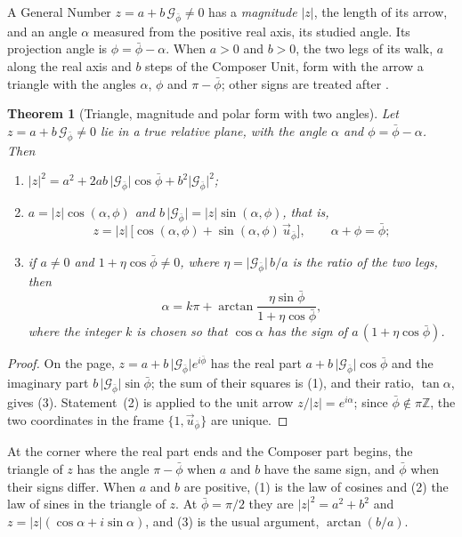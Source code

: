 \documentclass[11pt,a4paper]{amsart}
\theoremstyle{plain}
\newtheorem{theorem}{Theorem}[section]
\theoremstyle{definition}
\theoremstyle{remark}
\newcommand{\pb}{\bar{\phi}}                     %
\newcommand{\Gp}{\mathcal{G}_{\bar{\phi}}}       %
\newcommand{\up}{\vec{u}_{\bar{\phi}}}           %
\begin{document}
A General Number $z = a + b\,\Gp \neq 0$ has a \emph{magnitude} $\lvert z\rvert$, the length of its arrow, and an angle $\alpha$ measured from the positive real axis, its studied angle. Its projection angle is $\phi = \pb - \alpha$. When $a > 0$ and $b > 0$, the two legs of its walk, $a$ along the real axis and $b$ steps of the Composer Unit, form with the arrow a triangle with the angles $\alpha$, $\phi$ and $\pi - \pb$; other signs are treated after .

\begin{theorem}[Triangle, magnitude and polar form with two angles]\label{thm:triangle}
Let $z = a + b\,\Gp \neq 0$ lie in a true relative plane, with the angle $\alpha$ and $\phi = \pb - \alpha$. Then
\begin{enumerate}
  \item $\lvert z\rvert^2 = a^2 + 2ab\,\lvert\Gp\rvert\cos\pb + b^2\lvert\Gp\rvert^2$;
  \item $a = \lvert z\rvert\cos(\alpha, \phi)$ and $b\,\lvert\Gp\rvert = \lvert z\rvert\sin(\alpha, \phi)$, that is,
  \[
  z = \lvert z\rvert\,\bigl[\cos(\alpha, \phi) + \sin(\alpha, \phi)\,\up\bigr] , \qquad \alpha + \phi = \pb ;
  \]
  \item if $a \neq 0$ and $1 + \eta\cos\pb \neq 0$, where $\eta = \lvert\Gp\rvert\,b/a$ is the ratio of the two legs, then
  \[
  \alpha = k\pi + \arctan\frac{\eta\sin\pb}{1 + \eta\cos\pb} ,
  \]
  where the integer $k$ is chosen so that $\cos\alpha$ has the sign of $a\,(1 + \eta\cos\pb)$.
\end{enumerate}
\end{theorem}

\begin{proof}
On the page, $z = a + b\,\lvert\Gp\rvert e^{i\pb}$ has the real part $a + b\,\lvert\Gp\rvert\cos\pb$ and the imaginary part $b\,\lvert\Gp\rvert\sin\pb$; the sum of their squares is (1), and their ratio, $\tan\alpha$, gives (3). Statement~(2) is  applied to the unit arrow $z/\lvert z\rvert = e^{i\alpha}$; since $\pb \notin \pi\mathbb{Z}$, the two coordinates in the frame $\{1, \up\}$ are unique.
\end{proof}

At the corner where the real part ends and the Composer part begins, the triangle of $z$ has the angle $\pi - \pb$ when $a$ and $b$ have the same sign, and $\pb$ when their signs differ. When $a$ and $b$ are positive, (1) is the law of cosines and (2) the law of sines in the triangle of $z$. At $\pb = \pi/2$ they are $\lvert z\rvert^2 = a^2 + b^2$ and $z = \lvert z\rvert(\cos\alpha + i\sin\alpha)$, and (3) is the usual argument, $\arctan(b/a)$.
\end{document}
